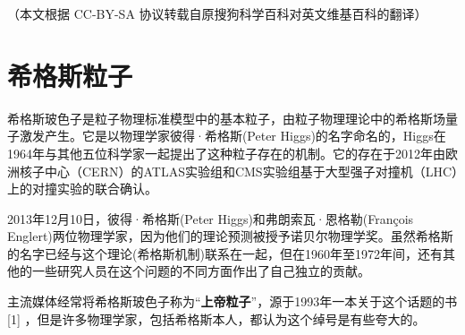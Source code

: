 
（本文根据 CC-BY-SA 协议转载自原搜狗科学百科对英文维基百科的翻译）

\section{希格斯粒子}

希格斯玻色子是粒子物理标准模型中的基本粒子，由粒子物理理论中的希格斯场量子激发产生。它是以物理学家彼得·希格斯(Peter Higgs)的名字命名的，Higgs在1964年与其他五位科学家一起提出了这种粒子存在的机制。它的存在于2012年由欧洲核子中心（CERN）的ATLAS实验组和CMS实验组基于大型强子对撞机（LHC）上的对撞实验的联合确认。

2013年12月10日，彼得·希格斯(Peter Higgs)和弗朗索瓦·恩格勒(François Englert)两位物理学家，因为他们的理论预测被授予诺贝尔物理学奖。虽然希格斯的名字已经与这个理论(希格斯机制)联系在一起，但在1960年至1972年间，还有其他的一些研究人员在这个问题的不同方面作出了自己独立的贡献。

主流媒体经常将希格斯玻色子称为“\textbf{上帝粒子}”，源于1993年一本关于这个话题的书[1] ，但是许多物理学家，包括希格斯本人，都认为这个绰号是有些夸大的。
